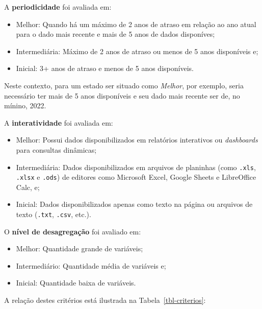 \documentclass[
  a4paper,
]{article}
\begin{document}
A \textbf{periodicidade} foi avaliada em:

\begin{itemize}
\item
  Melhor: Quando há um máximo de 2 anos de atraso em relação ao ano
  atual para o dado mais recente e mais de 5 anos de dados disponíves;
\item
  Intermediária: Máximo de 2 anos de atraso ou menos de 5 anos
  disponíveis e;
\item
  Inicial: 3+ anos de atraso e menos de 5 anos disponíveis.
\end{itemize}

Neste contexto, para um estado ser situado como \emph{Melhor}, por
exemplo, seria necessário ter mais de 5 anos disponíveis e seu dado mais
recente ser de, no mínino, 2022.

A \textbf{interatividade} foi avaliada em:

\begin{itemize}
\item
  Melhor: Possui dados disponibilizados em relatórios interativos ou
  \emph{dashboards} para consultas dinâmicas;
\item
  Intermediária: Dados disponibilizados em arquivos de planinhas (como
  \texttt{.xls}, \texttt{.xlsx} e \texttt{.ods}) de editores como
  Microsoft Excel, Google Sheets e LibreOffice Calc, e;
\item
  Inicial: Dados disponibilizados apenas como texto na página ou
  arquivos de texto (\texttt{.txt}, \texttt{.csv}, etc.).
\end{itemize}

O \textbf{nível de desagregação} foi avaliado em:

\begin{itemize}
\item
  Melhor: Quantidade grande de variáveis;
\item
  Intermediário: Quantidade média de variáveis e;
\item
  Inicial: Quantidade baixa de variáveis.
\end{itemize}

A relação destes critérios está ilustrada na Tabela~\ref{tbl-criterios}:

\break
\end{document}
